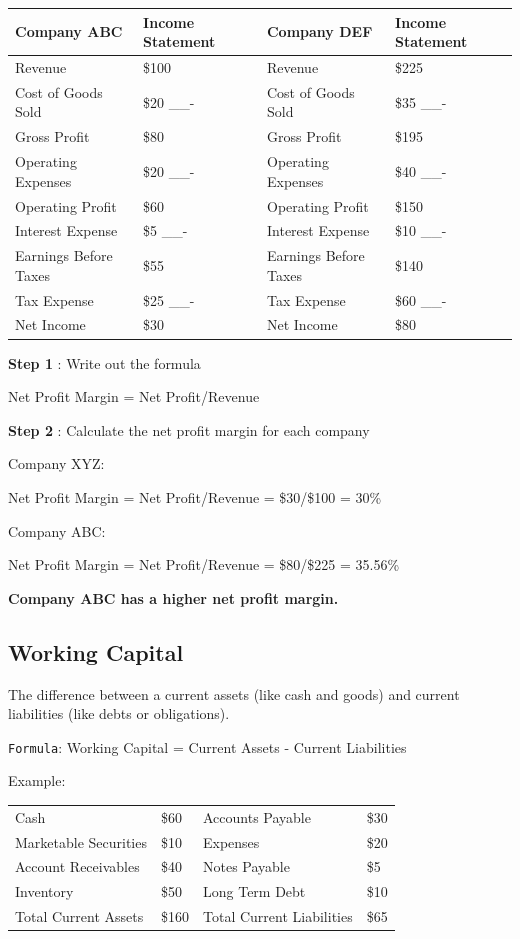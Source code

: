 \documentclass[]{book}
\begin{document}
\begin{longtable}[]{@{}llll@{}}
\toprule
Company ABC & Income Statement & Company DEF & Income
Statement\tabularnewline
\midrule
\endhead
Revenue & \$100 & Revenue & \$225\tabularnewline
Cost of Goods Sold & \$20 \_\_- & Cost of Goods Sold & \$35
\_\_-\tabularnewline
Gross Profit & \$80 & Gross Profit & \$195\tabularnewline
Operating Expenses & \$20 \_\_- & Operating Expenses & \$40
\_\_-\tabularnewline
Operating Profit & \$60 & Operating Profit & \$150\tabularnewline
Interest Expense & \$5 \_\_- & Interest Expense & \$10
\_\_-\tabularnewline
Earnings Before Taxes & \$55 & Earnings Before Taxes &
\$140\tabularnewline
Tax Expense & \$25 \_\_- & Tax Expense & \$60 \_\_-\tabularnewline
Net Income & \$30 & Net Income & \$80\tabularnewline
\bottomrule
\end{longtable}

\textbf{Step 1 }: Write out the formula

Net Profit Margin = Net Profit/Revenue

\textbf{Step 2 }: Calculate the net profit margin for each company

Company XYZ:

Net Profit Margin = Net Profit/Revenue = \$30/\$100 = 30\%

Company ABC:

Net Profit Margin = Net Profit/Revenue = \$80/\$225 = 35.56\%

\textbf{Company ABC has a higher net profit margin. }

\subsection{Working Capital}\label{working-capital}

The difference between a current assets (like cash and goods) and
current liabilities (like debts or obligations).

\texttt{Formula}: Working Capital = Current Assets - Current Liabilities

Example:

\begin{longtable}[]{@{}llll@{}}
\toprule
Cash & \$60 & Accounts Payable & \$30\tabularnewline
Marketable Securities & \$10 & Expenses & \$20\tabularnewline
Account Receivables & \$40 & Notes Payable & \$5\tabularnewline
Inventory & \$50 & Long Term Debt & \$10\tabularnewline
Total Current Assets & \$160 & Total Current Liabilities &
\$65\tabularnewline
\bottomrule
\end{longtable}
\end{document}
